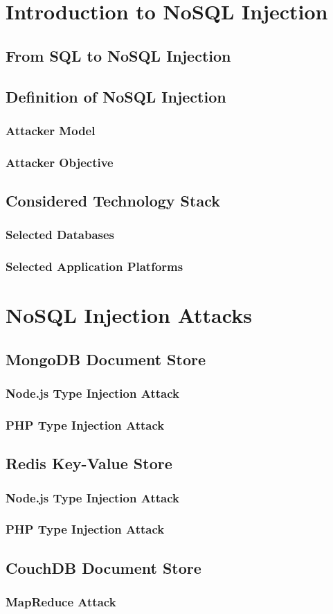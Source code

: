 \chapter{Introduction to NoSQL Injection}

\section{From SQL to NoSQL Injection}

\section{Definition of NoSQL Injection}
\subsection{Attacker Model}
\subsection{Attacker Objective}

\section{Considered Technology Stack}
\subsection{Selected Databases}
\subsection{Selected Application Platforms}

\chapter{NoSQL Injection Attacks}

\section{MongoDB Document Store}
\subsection{Node.js Type Injection Attack}
\subsection{PHP Type Injection Attack}

\section{Redis Key-Value Store}
\subsection{Node.js Type Injection Attack}
\subsection{PHP Type Injection Attack}

\section{CouchDB Document Store}
\subsection{MapReduce Attack}
